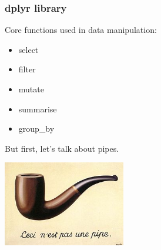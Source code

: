 \documentclass[12pt]{beamer}\usepackage[]{graphicx}\usepackage[]{color}
\begin{document}

\begin{frame}[fragile]\large
\frametitle{dplyr library}

Core functions used in data manipulation:

\begin{itemize}
 \item select 
 \item filter
 \item mutate
 \item summarise
 \item group\_by
\end{itemize}\bigskip

But first, let's talk about pipes.

\vspace{-4.5cm}\hspace{6cm}\includegraphics[width=0.4\textwidth,height=0.4\textheight,keepaspectratio]{./Images/MagrittePipe}
\end{frame}

\end{document}
